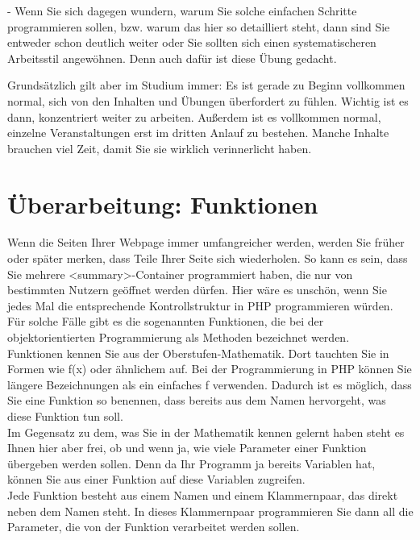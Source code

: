 -	Wenn Sie sich dagegen wundern, warum Sie solche einfachen Schritte programmieren sollen, bzw. warum das hier so detailliert steht, dann sind Sie entweder schon deutlich weiter oder Sie sollten sich einen systematischeren Arbeitsstil angewöhnen. Denn auch dafür ist diese Übung gedacht.

Grundsätzlich gilt aber im Studium immer: Es ist gerade zu Beginn vollkommen normal, sich von den Inhalten und Übungen überfordert zu fühlen. Wichtig ist es dann, konzentriert weiter zu arbeiten. Außerdem ist es vollkommen normal, einzelne Veranstaltungen erst im dritten Anlauf zu bestehen. Manche Inhalte brauchen viel Zeit, damit Sie sie wirklich verinnerlicht haben.

\section{Überarbeitung: Funktionen}

Wenn die Seiten Ihrer Webpage immer umfangreicher werden, werden Sie früher oder später merken, dass Teile Ihrer Seite sich wiederholen. So kann es sein, dass Sie mehrere <summary>-Container programmiert haben, die nur von bestimmten Nutzern geöffnet werden dürfen. Hier wäre es unschön, wenn Sie jedes Mal die entsprechende Kontrollstruktur in PHP programmieren würden. Für solche Fälle gibt es die sogenannten Funktionen, die bei der objektorientierten Programmierung als Methoden bezeichnet werden.\\

Funktionen kennen Sie aus der Oberstufen-Mathematik. Dort tauchten Sie in Formen wie f(x) oder ähnlichem auf. Bei der Programmierung in PHP können Sie längere Bezeichnungen als ein einfaches f verwenden. Dadurch ist es möglich, dass Sie eine Funktion so benennen, dass bereits aus dem Namen hervorgeht, was diese Funktion tun soll.\\

Im Gegensatz zu dem, was Sie in der Mathematik kennen gelernt haben steht es Ihnen hier aber frei, ob und wenn ja, wie viele Parameter einer Funktion übergeben werden sollen. Denn da Ihr Programm ja bereits Variablen hat, können Sie aus einer Funktion auf diese Variablen zugreifen.\\

Jede Funktion besteht aus einem Namen und einem Klammernpaar, das direkt neben dem Namen steht. In dieses Klammernpaar programmieren Sie dann all die Parameter, die von der Funktion verarbeitet werden sollen.\\

